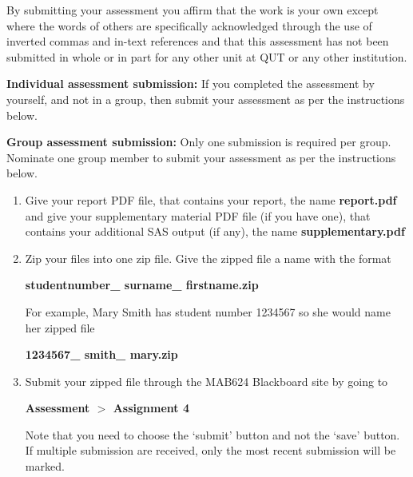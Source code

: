 \documentclass[11pt,a4paper]{article}
\begin{document}
By submitting your assessment you affirm that the work is your own except where the words of others are specifically acknowledged through the use of inverted commas and in-text references and that this assessment has not been submitted in whole or in part for any other unit at QUT or any other institution.

\textbf{Individual assessment submission:} If you completed the assessment by yourself, and not in a group, then submit your assessment as per the instructions below.

\textbf{Group assessment submission:} Only one submission is required per group.  Nominate one group member to submit your assessment as per the instructions below.

\begin{enumerate}
    \item Give your report PDF file, that contains your report, the name \textbf{report.pdf} and give your supplementary material PDF file (if you have one), that contains your additional SAS output (if any), the name \textbf{supplementary.pdf}
    \item Zip your files into one zip file.  Give the zipped file a name with the format
        \begin{center}
        \textbf{studentnumber\_ surname\_ firstname.zip}
        \end{center}
        For example, Mary Smith has student number 1234567 so she would name her zipped file
        \begin{center}
        \textbf{1234567\_ smith\_ mary.zip}
        \end{center}
    \item Submit your zipped file through the MAB624 Blackboard site by going to
        \begin{center}
            \textbf{Assessment $>$ Assignment 4}
        \end{center}
        Note that you need to choose the `submit' button and not the `save' button.  If multiple submission are received, only the most recent submission will be marked.
\end{enumerate}
\end{document}
